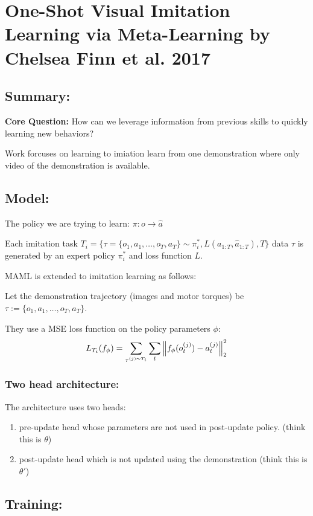 \section{One-Shot Visual Imitation Learning via Meta-Learning by Chelsea Finn et al. 2017}

\subsection{Summary:}
\textbf{Core Question:} How can we leverage information from previous skills to quickly learning
new behaviors?

Work forcuses on learning to imiation learn from one demonstration where only video of
the demonstration is available.

\subsection{Model:}

The policy we are trying to learn: $\pi: o \rightarrow \hat a$

Each imitation task $T_i = \{ \tau = \{ o_1, a_1, \dots, o_T, a_T \} \sim \pi^{*}_{i}, L(a_{1:T}, \hat a_{1:T}), T \}$
data $\tau$ is generated by an expert policy $\pi^{*}_{i}$ and loss function $L$.

MAML is extended to imitation learning as follows:

Let the demonstration trajectory (images and motor torques) be $\tau := \{o_1, a_1, \dots, o_T, a_T \}$.

They use a MSE loss function on the policy parameters $\phi$:
$$L_{T_i}(f_\phi) = \sum_{\tau^{(j) \sim T_i}} \sum_t \left\lVert f_{\phi}(o_t^{(j)}) - a_t^{(j)}\right\rVert_2^2$$

\subsubsection{Two head architecture:}

The architecture uses two heads:
\begin{enumerate}
    \item pre-update head whose parameters are not used in post-update policy. (think this is $\theta$)
    \item post-update head which is not updated using the demonstration (think this is $\theta'$)
\end{enumerate}

\subsection{Training:}

